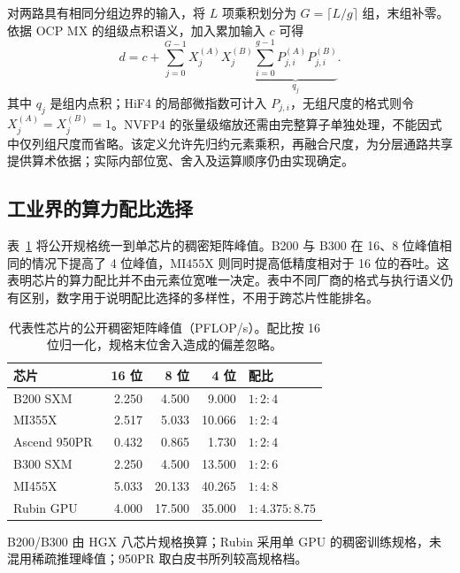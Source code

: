 对两路具有相同分组边界的输入，将 $L$ 项乘积划分为 $G=\lceil L/g\rceil$ 组，末组补零。依据 OCP MX 的组级点积语义，加入累加输入 $c$ 可得~\cite{ocpmx2023}
\begin{equation}
d=c+\sum_{j=0}^{G-1}X_j^{(A)}X_j^{(B)}
\underbrace{\sum_{i=0}^{g-1}P_{j,i}^{(A)}P_{j,i}^{(B)}}_{q_j}.
\label{eq:blockdot}
\end{equation}
其中 $q_j$ 是组内点积；HiF4 的局部微指数可计入 $P_{j,i}$，无组尺度的格式则令 $X_j^{(A)}=X_j^{(B)}=1$。NVFP4 的张量级缩放还需由完整算子单独处理，不能因式中仅列组尺度而省略。该定义允许先归约元素乘积，再融合尺度，为分层通路共享提供算术依据；实际内部位宽、舍入及运算顺序仍由实现确定。

\subsection{工业界的算力配比选择}
\label{sec:commercial_ratios}
\label{sec:ratio_motivation}

表~\ref{tab:vendor_ratios} 将公开规格统一到单芯片的稠密矩阵峰值。B200 与 B300 在 16、8 位峰值相同的情况下提高了 4 位峰值，MI455X 则同时提高低精度相对于 16 位的吞吐。这表明芯片的算力配比并不由元素位宽唯一决定。表中不同厂商的格式与执行语义仍有区别，数字用于说明配比选择的多样性，不用于跨芯片性能排名。

\begin{table}[t]
\centering
\caption{代表性芯片的公开稠密矩阵峰值（PFLOP/s）。配比按 16 位归一化，规格末位舍入造成的偏差忽略。}
\label{tab:vendor_ratios}
\begingroup\footnotesize\setlength{\tabcolsep}{2pt}
\begin{tabular*}{\columnwidth}{@{\extracolsep{\fill}}lrrrl@{}}\toprule
芯片 & 16 位 & 8 位 & 4 位 & 配比 \\\midrule
B200 SXM~\cite{nvidiahgx} & 2.250 & 4.500 & 9.000 & $1:2:4$ \\
MI355X~\cite{amdmi355x} & 2.517 & 5.033 & 10.066 & $1:2:4$ \\
Ascend 950PR~\cite{huawei950} & 0.432 & 0.865 & 1.730 & $1:2:4$ \\
B300 SXM~\cite{nvidiahgx} & 2.250 & 4.500 & 13.500 & $1:2:6$ \\
MI455X~\cite{amdmi455x} & 5.033 & 20.133 & 40.265 & $1:4:8$ \\
Rubin GPU~\cite{nvidiaverarubin} & 4.000 & 17.500 & 35.000 & $1:4.375:8.75$ \\
\bottomrule
\end{tabular*}
\par\smallskip
\parbox{\columnwidth}{\raggedright B200/B300 由 HGX 八芯片规格换算；Rubin 采用单 GPU 的稠密训练规格，未混用稀疏推理峰值；950PR 取白皮书所列较高规格档。}
\endgroup
\end{table}

